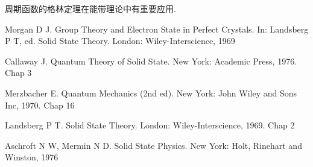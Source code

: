 周期函数的格林定理在能带理论中有重要应用.

\begin{canKao}
\begin{enumerate}[label={[\arabic*]}, leftmargin=2.2em, itemsep=0pt]
\item Morgan D J. Group Theory and Electron State in Perfect Crystals. In: Landsberg P T, ed. Solid State Theory. London: Wiley-Interscience, 1969
\item Callaway J. Quantum Theory of Solid State. New York: Academic Press, 1976. Chap 3
\item Merzbacher E. Quantum Mechanics (2nd ed). New York: John Wiley and Sons Inc, 1970. Chap 16
\item Landsberg P T. Solid State Theory. London: Wiley-Interscience, 1969. Chap 2
\item Aschroft N W, Mermin N D. Solid State Physics. New York: Holt, Rinehart and Winston, 1976
\end{enumerate}
\end{canKao}
